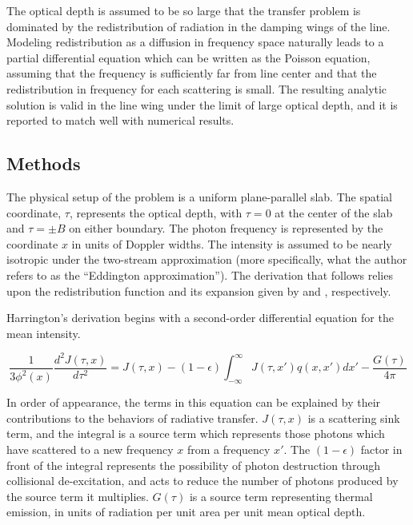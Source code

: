 \documentclass[onecolumn]{aastex63}
\begin{document}
The optical depth is assumed to be so large that the transfer problem is dominated by the redistribution of radiation in the damping wings of the line. Modeling redistribution as a diffusion in frequency space naturally leads to a partial differential equation which can be written as the Poisson equation, assuming that the frequency is sufficiently far from line center and that the redistribution in frequency for each scattering is small. The resulting analytic solution is valid in the line wing under the limit of large optical depth, and it is reported to match well with numerical results.

\subsection{Methods}
The physical setup of the problem is a uniform plane-parallel slab. The spatial coordinate, $\tau$, represents the optical depth, with $\tau=0$ at the center of the slab and $\tau=\pm B$ on either boundary. The photon frequency is represented by the coordinate $x$ in units of Doppler widths. The intensity is assumed to be nearly isotropic under the two-stream approximation (more specifically, what the author refers to as the ``Eddington approximation''). The derivation that follows relies upon the redistribution function and its expansion given by \cite{hummer1962} and \cite{1972ApJ...174..439A}, respectively. 


Harrington's derivation begins with a second-order differential equation for the mean intensity.

\begin{equation} \label{harrington1}
    \frac{1}{3\phi^2(x)}\frac{d^2J(\tau, x)}{d\tau^2} = J(\tau, x) - (1-\epsilon)\int_{-\infty}^{\infty}J(\tau, x')q(x, x')dx' - \frac{G(\tau)}{4\pi}
\end{equation}

In order of appearance, the terms in this equation can be explained by their contributions to the behaviors of radiative transfer. $J(\tau, x)$ is a scattering sink term, and the integral is a source term which represents those photons which have scattered to a new frequency $x$ from a frequency $x'$. The $(1-\epsilon)$ factor in front of the integral represents the possibility of photon destruction through collisional de-excitation, and acts to reduce the number of photons produced by the source term it multiplies. $G(\tau)$ is a source term representing thermal emission, in units of radiation per unit area per unit mean optical depth. 
\end{document}
